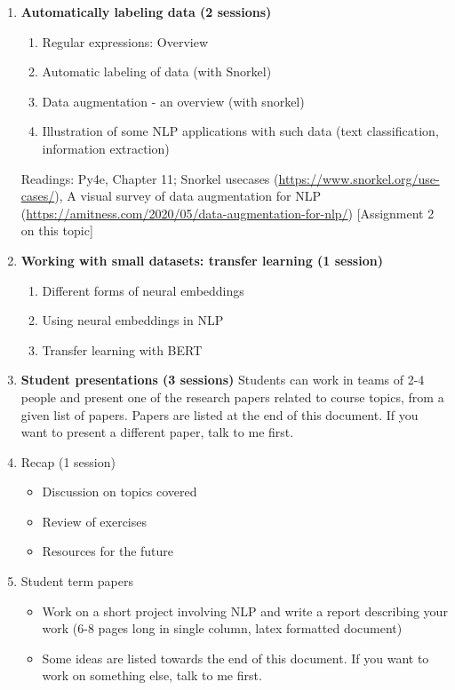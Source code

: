\documentclass[11pt,a4paper]{article}
\begin{document}
\begin{enumerate}
\item \textbf{Automatically labeling data (2 sessions)} 
\begin{enumerate}[label=1.\arabic*]
\item Regular expressions: Overview
\item Automatic labeling of data (with Snorkel)
\item Data augmentation - an overview (with snorkel)
\item Illustration of some NLP applications with such data (text classification, information extraction)
\end{enumerate}
Readings: Py4e, Chapter 11; Snorkel usecases (\url{https://www.snorkel.org/use-cases/}), A visual survey of data augmentation for NLP (\url{https://amitness.com/2020/05/data-augmentation-for-nlp/})
[Assignment 2 on this topic]

\item \textbf{Working with small datasets: transfer learning (1 session)}
\begin{enumerate}
    \item Different forms of neural embeddings
    \item Using neural embeddings in NLP
    \item Transfer learning with BERT
\end{enumerate}

\item \textbf{Student presentations (3 sessions)}
Students can work in teams of 2-4 people and present one of the research papers related to course topics, from a given list of papers. Papers are listed at the end of this document. If you want to present a different paper, talk to me first. 

\item Recap (1 session)
\begin{itemize}
\item Discussion on topics covered
\item Review of exercises
\item Resources for the future
\end{itemize}

\item Student term papers 
\begin{itemize}
\item Work on a short project involving NLP and write  a report describing your work (6-8 pages long in single column, latex formatted document)
\item Some ideas are listed towards the end of this document. If you want to work on something else, talk to me first. 
\end{itemize}
\end{enumerate}
\end{document}
